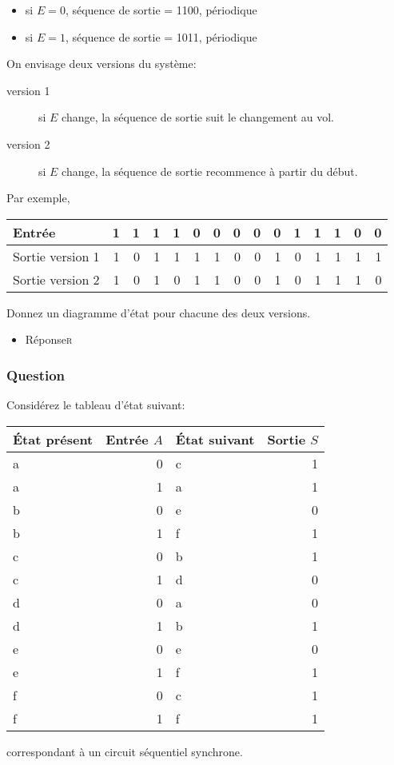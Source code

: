 \documentclass[11pt]{article}
\begin{document}
\begin{itemize}
\item si \(E=0\), séquence de sortie = 1100, périodique

\item si \(E=1\), séquence de sortie = 1011, périodique
\end{itemize}

On envisage deux versions du système:

\begin{description}
\item[{version 1}] si  \(E\) change, la séquence de sortie suit le
changement au vol.

\item[{version 2}] si \(E\) change, la séquence de sortie recommence à
partir du début.
\end{description}

Par exemple,
\begin{center}
\begin{tabular}{lrrrrrrrrrrrrrr}
Entrée & 1 & 1 & 1 & 1 & 0 & 0 & 0 & 0 & 0 & 1 & 1 & 1 & 0 & 0\\
\hline
Sortie version 1 & 1 & 0 & 1 & 1 & 1 & 1 & 0 & 0 & 1 & 0 & 1 & 1 & 1 & 1\\
Sortie version 2 & 1 & 0 & 1 & 0 & 1 & 1 & 0 & 0 & 1 & 0 & 1 & 1 & 1 & 0\\
\end{tabular}
\end{center}

Donnez un diagramme d'état pour chacune des deux versions.

\begin{itemize}
\item Réponse\hfill{}\textsc{r}
\label{sec:orgf1b7ee9}
\end{itemize}

\subsubsection*{Question}
\label{sec:org51c1a9e}
Considérez le tableau d'état suivant:
\begin{center}
\begin{tabular}{lrlr}
État présent & Entrée \(A\) & État suivant & Sortie \(S\)\\
\hline
a & 0 & c & 1\\
a & 1 & a & 1\\
b & 0 & e & 0\\
b & 1 & f & 1\\
c & 0 & b & 1\\
c & 1 & d & 0\\
d & 0 & a & 0\\
d & 1 & b & 1\\
e & 0 & e & 0\\
e & 1 & f & 1\\
f & 0 & c & 1\\
f & 1 & f & 1\\
\end{tabular}
\end{center}
correspondant à un circuit séquentiel synchrone.
\end{document}

